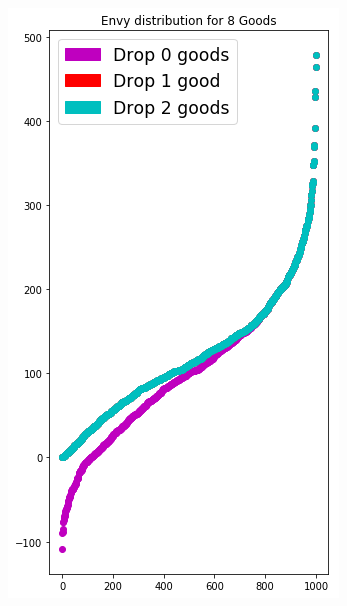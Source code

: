 \begin{figure}[h!]
\begin{subfigure}[b]{0.47\linewidth}
    \includegraphics[width=\linewidth]{images/envy_density/envy_density_uv8.png}
    \caption{}
  \end{subfigure}
  \begin{subfigure}[b]{0.47\linewidth}

\end{subfigure}
\end{figure}
